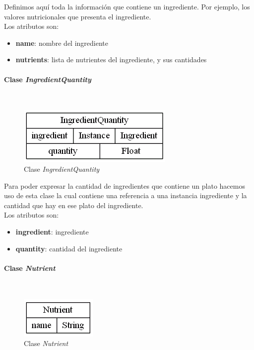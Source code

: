 \documentclass[12]{article}
\begin{document}
Definimos aquí toda la información que contiene un ingrediente. Por ejemplo, los valores nutricionales que presenta el ingrediente.
\\

Los atributos son: 
\begin{itemize}
\item \textbf{name}: nombre del ingrediente
\item \textbf{nutrients}: lista de nutrientes del ingrediente, y sus cantidades
\end{itemize}


\vspace{0.5cm}


\paragraph{Clase \emph{IngredientQuantity}}\mbox{}\\
\begin{figure}[H]
\centering
\includegraphics[scale=0.5]{images/class_IngredientQuantity.png}
\caption{Clase \emph{IngredientQuantity}}
\label{fig_class_IngredientQuantity}
\end{figure}

Para poder expresar la cantidad de ingredientes que contiene un plato hacemos uso de esta clase la cual contiene una referencia a una instancia ingrediente y la cantidad que hay en ese plato del ingrediente.
\\

Los atributos son:
\begin{itemize}
\item \textbf{ingredient}: ingrediente
\item \textbf{quantity}: cantidad del ingrediente
\end{itemize}


\vspace{0.5cm}

\paragraph{Clase \emph{Nutrient}}\mbox{}\\
\begin{figure}[H]
\centering
\includegraphics[scale=0.5]{images/class_Nutrient.png}
\caption{Clase \emph{Nutrient}}
\label{fig_class_Nutrient}
\end{figure}
\end{document}
